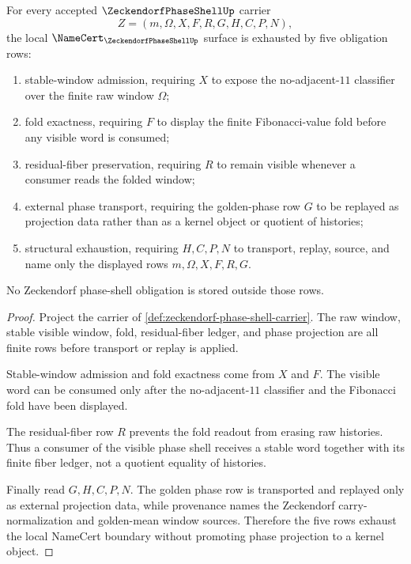 \begin{theorem}
\label{thm:zeckendorf-phase-shell-namecert-boundary}
For every accepted $\ZeckendorfPhaseShellUp$ carrier
$$
Z=(m,\Omega,X,F,R,G,H,C,P,N),
$$
the local $\NameCert_{\ZeckendorfPhaseShellUp}$ surface is exhausted by five obligation rows:
\begin{enumerate}
\item stable-window admission, requiring $X$ to expose the no-adjacent-$11$ classifier over the finite raw window $\Omega$;
\item fold exactness, requiring $F$ to display the finite Fibonacci-value fold before any visible word is consumed;
\item residual-fiber preservation, requiring $R$ to remain visible whenever a consumer reads the folded window;
\item external phase transport, requiring the golden-phase row $G$ to be replayed as projection data rather than as a kernel object or quotient of histories;
\item structural exhaustion, requiring $H,C,P,N$ to transport, replay, source, and name only the displayed rows $m,\Omega,X,F,R,G$.
\end{enumerate}
No Zeckendorf phase-shell obligation is stored outside those rows.
\end{theorem}
\begin{proof}
Project the carrier of \autoref{def:zeckendorf-phase-shell-carrier}. The raw window, stable visible window, fold, residual-fiber ledger, and phase projection are all finite rows before transport or replay is applied.

Stable-window admission and fold exactness come from $X$ and $F$. The visible word can be consumed only after the no-adjacent-$11$ classifier and the Fibonacci fold have been displayed.

The residual-fiber row $R$ prevents the fold readout from erasing raw histories. Thus a consumer of the visible phase shell receives a stable word together with its finite fiber ledger, not a quotient equality of histories.

Finally read $G,H,C,P,N$. The golden phase row is transported and replayed only as external projection data, while provenance names the Zeckendorf carry-normalization and golden-mean window sources. Therefore the five rows exhaust the local NameCert boundary without promoting phase projection to a kernel object.
\end{proof}

